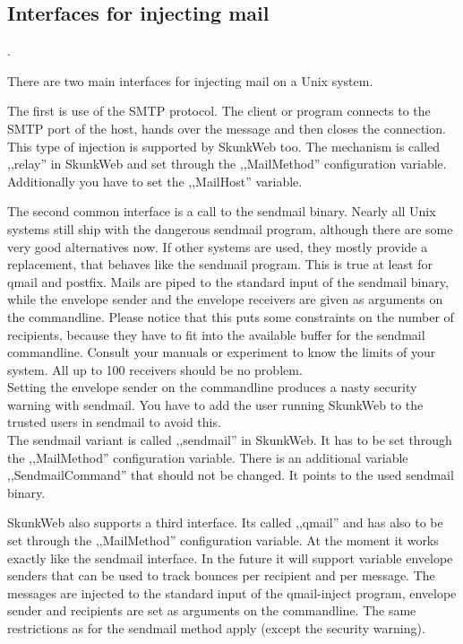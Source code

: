 \documentclass{article}
\begin{document}
\subsection{Interfaces for injecting mail}
\label{sec:interfaces}.

There are two main interfaces for injecting mail on a Unix system.

The first is use of the SMTP protocol. The client or program connects
to the SMTP port of the host, hands over the message and then closes the
connection. This type of injection is supported by SkunkWeb too. The
mechanism is called ,,relay'' in SkunkWeb and set through the ,,MailMethod''
configuration variable. Additionally you have to set the ,,MailHost''
variable.

The second common interface is a call to the sendmail binary. Nearly all
Unix systems still ship with the dangerous sendmail program, although
there are some very good alternatives now. If other systems are used,
they mostly provide a replacement, that behaves like the sendmail
program. This is true at least for qmail and postfix.
Mails are piped to the standard input of the sendmail binary,
while the envelope sender and
the envelope receivers are given as arguments on the commandline.
Please notice that
this puts some constraints on the number of recipients, because they have
to fit into the available buffer for the sendmail commandline.
Consult your manuals or experiment to know the limits of your system.
All up to 100 receivers should be no problem.\\
Setting the envelope sender on the commandline produces a nasty security
warning with sendmail. You have to add the user running SkunkWeb to the
trusted users in sendmail to avoid this.\\
The sendmail variant is called ,,sendmail'' in SkunkWeb. It has to be set
through the ,,MailMethod'' configuration variable. There is an additional
variable ,,SendmailCommand'' that should not be changed. It points to the
used sendmail binary.

SkunkWeb also supports a third interface. Its called ,,qmail'' and has also
to be set through the ,,MailMethod'' configuration variable. At the moment
it works exactly like the sendmail interface. In the future it will support
variable envelope senders that can be used to track bounces per recipient
and per message. The messages are injected to the standard input of the
qmail-inject program, envelope sender and recipients are set as arguments
on the commandline. The same restrictions as for the sendmail method
apply (except the security warning).
\end{document}
